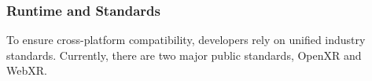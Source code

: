 \subsubsection{Runtime and Standards}

To ensure cross-platform compatibility, developers rely on unified industry standards. Currently, there are two major public standards, OpenXR and WebXR.



